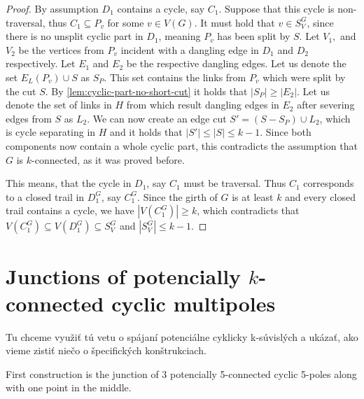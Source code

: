 \documentclass[12pt, twoside]{book}
\begin{document}
\begin{proof}
	By assumption $D_1$ contains a cycle, say $C_1$. Suppose that this cycle is non-traversal, thus $C_1\subseteq P_v$ for some $v\in V(G)$. It must hold that $v\in S_V^G$, since there is no unsplit cyclic part in $D_1$, meaning $P_v$ has been split by $S$. Let $V_1,$ and $V_2$ be the vertices from $P_v$ incident with a dangling edge in $D_1$ and $D_2$ respectively. Let $E_1$ and $E_2$ be the respective dangling edges. Let us denote the set $E_L(P_v)\cup S$ as $S_P$. This set contains the links from $P_v$ which were split by the cut $S$. By \cref{lem:cyclic-part-no-short-cut} it holds that $|S_P|\geq|E_2|$. Let us denote the set of links in $H$ from which result dangling edges in $E_2$ after severing edges from $S$ as $L_2$. We can now create an edge cut $S'=(S-S_P)\cup L_2$, which is cycle separating in $H$ and it holds that $|S'|\leq |S|\leq k-1$. Since both components now contain a whole cyclic part, this contradicts the assumption that $G$ is $k$-connected, as it was proved before.
	
	This means, that the cycle in $D_1$, say $C_1$ must be traversal. Thus $C_1$ corresponds to a closed trail in $D_1^G$, say $C_1^G$. Since the girth of $G$ is at least $k$ and every closed trail contains a cycle, we have $|V(C_1^G)|\geq k$, which contradicts that $V(C_1^G)\subseteq V(D_1^G)\subseteq S_V^G$ and $|S_V^G|\leq k-1$.
	
\end{proof}

\section{Junctions of potencially $k$-connected cyclic multipoles}\label{sec:cyclic-part-junctions}

Tu chceme využiť tú vetu o spájaní potenciálne cyklicky k-súvislých a ukázať, ako vieme zistiť niečo o špecifických konštrukciach.

First construction is the junction of 3 potencially 5-connected cyclic 5-poles along with one point in the middle.
\end{document}
